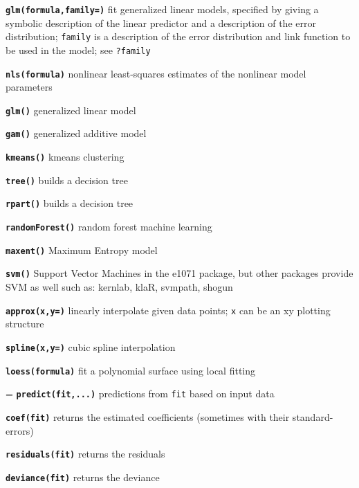 \documentclass[8pt,landscape]{article}
\newcommand{\code}{\texttt}
\newcommand{\bcode}[1]{\texttt{\textbf{#1}}}
\begin{document}
\begin{multicols*}{3}
\bcode{glm(formula,family=)} fit generalized linear models, specified by
     giving a symbolic description of the linear predictor and a
     description of the error distribution; \code{family} is a
     description of the error distribution and link function to
          be used in the model; see \code{?family}

\bcode{nls(formula)} nonlinear least-squares estimates of the nonlinear
     model parameters

\bcode{glm()} generalized linear model

\bcode{gam()} generalized additive model

\bcode{kmeans()} kmeans clustering

\bcode{tree()} builds a decision tree

\bcode{rpart()} builds a decision tree

\bcode{randomForest()} random forest machine learning

\bcode{maxent()} Maximum Entropy model

\bcode{svm()} Support Vector Machines in the e1071 package, but other packages provide SVM as well such as: kernlab, klaR, svmpath, shogun

     
     
\bcode{approx(x,y=)} linearly interpolate given data points; \code{x} can be an
xy plotting structure

\bcode{spline(x,y=)} cubic spline interpolation

\bcode{loess(formula)} fit a polynomial surface using local fitting


\everypar={\hangindent=9mm}
\bcode{predict(fit,...)}  predictions from \code{fit} based on input data


\bcode{coef(fit)}  returns the estimated coefficients (sometimes with their standard-errors)

\bcode{residuals(fit)}  returns the residuals

\bcode{deviance(fit)}  returns the deviance


\end{multicols*}
\end{document}
